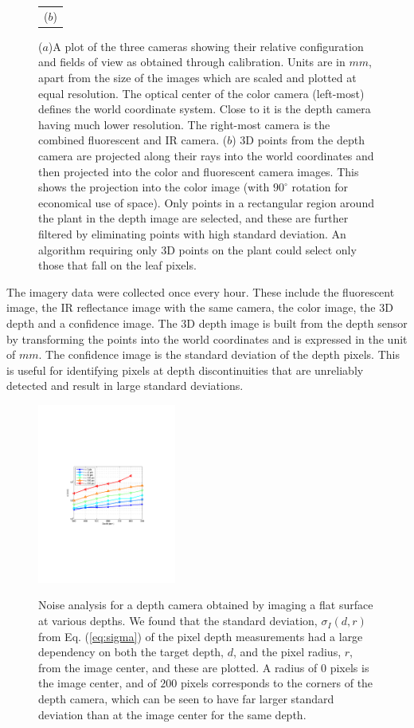 \begin{figure}
\begin{tabular}{c}
  ($b$)\\
\end{tabular}
\caption{($a$)A plot of the three cameras showing their relative configuration and fields of view as obtained through calibration.  Units are in $mm$, apart from the size of the images which are scaled and plotted at equal resolution.  The optical center of the color camera (left-most) defines the world coordinate system.  Close to it is the depth camera having much lower resolution.  The right-most camera is the combined fluorescent and IR camera. ($b$) $3$D points from the depth camera are projected along their rays into the world coordinates and then projected into the color and fluorescent camera images.  This shows the projection into the color image (with $90^{\circ}$ rotation for economical use of space).  Only points in a rectangular region around the plant in the depth image are selected, and these are further filtered by eliminating points with high standard deviation.  An algorithm requiring only $3$D points on the plant could select only those that fall on the leaf pixels.}
\label{fig:CameraConfiguration}
\end{figure}

The imagery data were collected once every hour.
These include the fluorescent image, the IR reflectance image with the same camera, the color image, the $3$D depth and a confidence image.  
The $3$D depth image is built from the depth sensor by transforming the points into the world coordinates and is expressed in the unit of $mm$.  
The confidence image is the standard deviation of the depth pixels.  
This is useful for identifying pixels at depth discontinuities that are unreliably detected and result in large standard deviations.  


\begin{figure}
\centering
  \includegraphics[height=5.9cm,trim=110 250 60 260,clip]{Figures/SigmaRadius} \\
\caption{Noise analysis for a depth camera obtained by imaging a flat surface at various depths.  We found that the standard deviation, $\sigma_I(d,r)$ from Eq. (\ref{eq:sigma}) of the pixel depth measurements had a large dependency on both the target depth, $d$, and the pixel radius, $r$, from the image center, and these are plotted.  A radius of $0$ pixels is the image center, and of $200$ pixels corresponds to the corners of the depth camera, which can be seen to have far larger standard deviation than at the image center for the same depth. }
\label{fig:Noise}
\end{figure}

